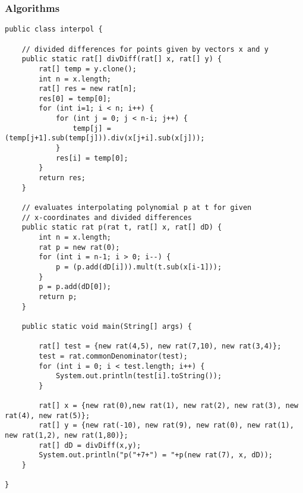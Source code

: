 \documentclass[9pt]{article}   	%
\begin{document}
\subsubsection{Algorithms}
\begin{lstlisting}
public class interpol {
	
	// divided differences for points given by vectors x and y
	public static rat[] divDiff(rat[] x, rat[] y) {
		rat[] temp = y.clone();
		int n = x.length;
		rat[] res = new rat[n];
		res[0] = temp[0];
		for (int i=1; i < n; i++) {
			for (int j = 0; j < n-i; j++) {
				temp[j] = (temp[j+1].sub(temp[j])).div(x[j+i].sub(x[j]));
			}
			res[i] = temp[0];
		}
		return res;
	}
	
	// evaluates interpolating polynomial p at t for given 
	// x-coordinates and divided differences
	public static rat p(rat t, rat[] x, rat[] dD) {
		int n = x.length;
		rat p = new rat(0);
		for (int i = n-1; i > 0; i--) {
			p = (p.add(dD[i])).mult(t.sub(x[i-1]));
		}
		p = p.add(dD[0]);
		return p;
	}
	
	public static void main(String[] args) {
	
		rat[] test = {new rat(4,5), new rat(7,10), new rat(3,4)};
		test = rat.commonDenominator(test);
		for (int i = 0; i < test.length; i++) {
			System.out.println(test[i].toString());
		}
	
		rat[] x = {new rat(0),new rat(1), new rat(2), new rat(3), new rat(4), new rat(5)};
		rat[] y = {new rat(-10), new rat(9), new rat(0), new rat(1), new rat(1,2), new rat(1,80)};
		rat[] dD = divDiff(x,y);
		System.out.println("p("+7+") = "+p(new rat(7), x, dD));
	}

}
\end{lstlisting}
\end{document}
